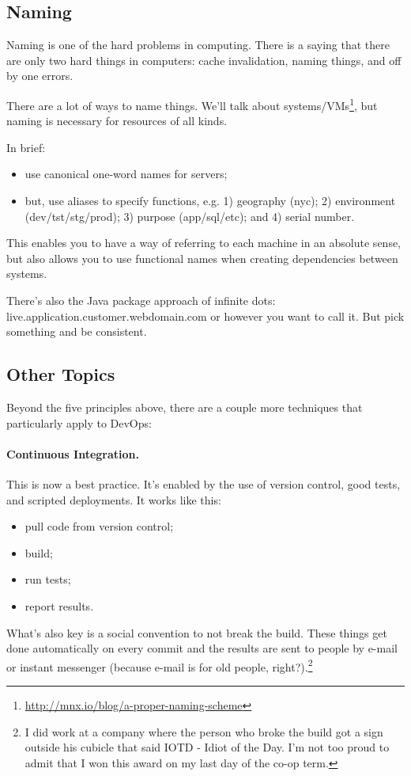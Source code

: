 \documentclass[a4paper]{report}
\begin{document}
\subsection*{Naming}
Naming is one of the hard problems in computing. There is a saying that there are only two hard things in computers: cache invalidation, naming things, and off by one errors. 

There are a
lot of ways to name things. We'll talk about
systems/VMs\footnote{\url{http://mnx.io/blog/a-proper-naming-scheme}},
but naming is necessary for resources of all kinds.

In brief:
\begin{itemize}
\item use canonical one-word names for servers;
\item but, use aliases to specify functions, e.g. 1) geography (nyc); 2) environment (dev/tst/stg/prod); 
3) purpose (app/sql/etc); and 4) serial number.
\end{itemize}
This enables you to have a way of referring to each machine in an absolute sense, but also 
allows you to use functional names when creating dependencies between systems.

There's also the Java package approach of infinite dots: live.application.customer.webdomain.com or however you want to call it. But pick something and be consistent.

\subsection*{Other Topics}
Beyond the five principles above, there are a couple more techniques that particularly apply to
DevOps:

\paragraph{Continuous Integration.} 
This is now a best practice. It's enabled by the use of version control, good tests, and scripted deployments.
It works like this:
\begin{itemize}
\item pull code from version control;
\item build;
\item run tests;
\item report results.
\end{itemize}
What's also key is a social convention to not break the build. These things get done automatically on every commit and the results are sent to people by e-mail or instant messenger (because e-mail is for old people, right?).\footnote{I did work at a company where the person who broke the build got a sign outside his cubicle that said IOTD - Idiot of the Day. I'm not too proud to admit that I won this award on my last day of the co-op term.}
\end{document}
